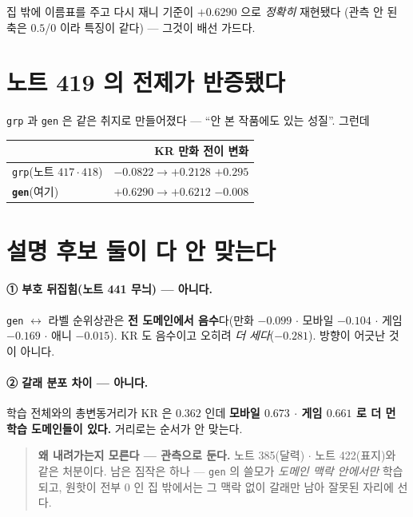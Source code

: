\documentclass[11pt]{article}
\begin{document}
집 밖에 이름표를 주고 다시 재니 기준이 $+0.6290$ 으로 \emph{정확히} 재현됐다
(관측 안 된 축은 $0.5$/$0$ 이라 특징이 같다) --- 그것이 배선 가드다.

\section{노트 419 의 전제가 반증됐다}

\texttt{grp} 과 \texttt{gen} 은 같은 취지로 만들어졌다 --- ``안 본 작품에도
있는 성질''. 그런데

\begin{center}
\begin{tabular}{lr}
\hline
 & KR 만화 전이 변화 \\
\hline
\texttt{grp}(노트 $417 \cdot 418$) & $-0.0822 \to +0.2128$ \quad $\mathbf{+0.295}$ \\
\textbf{\texttt{gen}}(여기) & $+0.6290 \to +0.6212$ \quad $\mathbf{-0.008}$ \\
\hline
\end{tabular}
\end{center}

\section{설명 후보 둘이 다 안 맞는다}

\paragraph{① 부호 뒤집힘(노트 441 무늬) --- 아니다.} \texttt{gen} $\leftrightarrow$
라벨 순위상관은 \textbf{전 도메인에서 음수}다(만화 $-0.099$ $\cdot$ 모바일
$-0.104$ $\cdot$ 게임 $-0.169$ $\cdot$ 애니 $-0.015$). KR 도 음수이고 오히려
\emph{더 세다}($-0.281$). 방향이 어긋난 것이 아니다.

\paragraph{② 갈래 분포 차이 --- 아니다.} 학습 전체와의 총변동거리가 KR 은
$0.362$ 인데 \textbf{모바일 $0.673$ $\cdot$ 게임 $0.661$ 로 더 먼 학습
도메인들이 있다.} 거리로는 순서가 안 맞는다.

\begin{quote}
\textbf{왜 내려가는지 모른다 --- 관측으로 둔다.} 노트 385(달력) $\cdot$
노트 422(표지)와 같은 처분이다. 남은 짐작은 하나 --- \texttt{gen} 의 쓸모가
\emph{도메인 맥락 안에서만} 학습되고, 원핫이 전부 $0$ 인 집 밖에서는 그
맥락 없이 갈래만 남아 잘못된 자리에 선다.
\end{quote}
\end{document}
